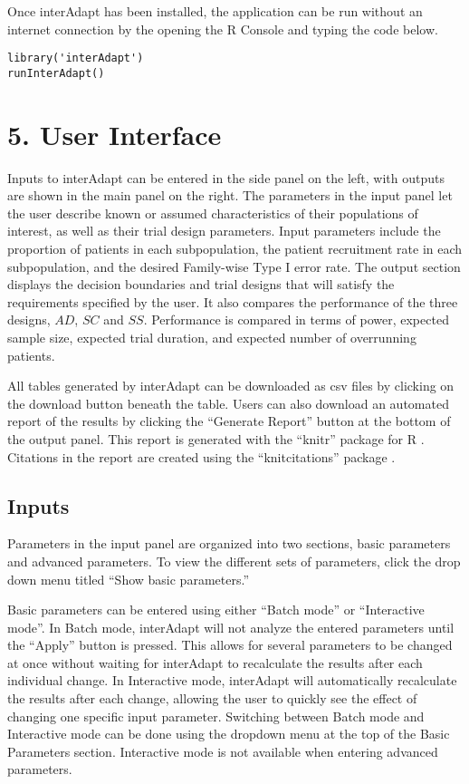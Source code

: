 \documentclass{article}
\newcommand{\interAdapt}{\textsf{interAdapt }}
\begin{document}
Once interAdapt has been installed, the application can be run without an internet connection by the opening the R Console and typing the code below.

\vspace{5 mm}
\begin{verbatim}
library('interAdapt')
runInterAdapt()
\end{verbatim}
\vspace{5 mm}




\section*{5. User Interface}

Inputs to \interAdapt can be entered in the side panel on the left, with outputs are shown in the main panel on the right. %
The parameters in the input panel let the user describe known or assumed characteristics of their populations of interest, as well as their trial design parameters. Input parameters include the proportion of patients in each subpopulation, the patient recruitment rate in each subpopulation, and the desired Family-wise Type I error rate. The output section displays the decision boundaries and trial designs that will satisfy the requirements specified by the user. It also compares the performance of the three designs, $AD$, $SC$ and $SS$. Performance is compared in terms of power, expected sample size, expected trial duration, and expected number of overrunning patients.

All tables generated by \interAdapt can be downloaded as csv files by clicking on the download button beneath the table. Users can also download an automated report of the results by clicking the ``Generate Report'' button at the bottom of the output panel. This report is generated with the ``knitr'' package for R \cite{knitr}. Citations in the report are created using the ``knitcitations'' package \cite{knitcitations}.

\subsection*{Inputs}

Parameters in the input panel are organized into two sections, basic parameters and advanced parameters. To view the different sets of parameters, click the drop down menu titled “Show basic parameters.” 

Basic parameters can be entered using either “Batch mode” or “Interactive mode”. In Batch mode, \interAdapt will not analyze the entered parameters until the “Apply” button is pressed. This allows for several parameters to be changed at once without waiting for \interAdapt to recalculate the results after each individual change. In Interactive mode, \interAdapt will automatically recalculate the results after each change, allowing the user to quickly see the effect of changing one specific input parameter. Switching between Batch mode and Interactive mode can be done using the dropdown menu at the top of the Basic Parameters section. Interactive mode is not available when entering advanced parameters.
\end{document}
